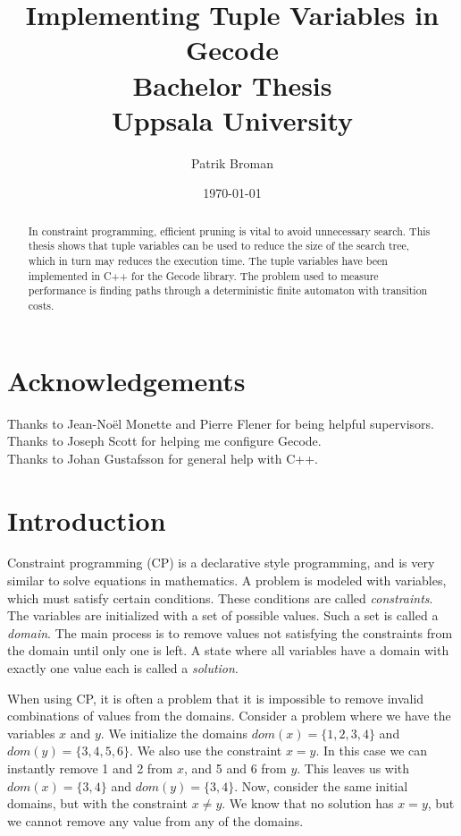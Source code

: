 \documentclass[a4paper,11pt]{article}
\title{\textbf{Implementing Tuple Variables in Gecode\\
	Bachelor Thesis \\
    Uppsala University  \\
  }
}
\author{Patrik Broman}
\date{\today}
\begin{document}
\maketitle
{}

\begin{abstract}

In constraint programming, efficient pruning is vital to avoid unnecessary search. This thesis shows that tuple variables can be used to reduce the size of the search tree, which in turn may reduces the execution time. The tuple variables have been implemented in C++ for the Gecode library. The problem used to measure performance is finding paths through a deterministic finite automaton with transition costs.

\end{abstract}

\setcounter{tocdepth}{2}
\tableofcontents
\pagestyle{plain}

\section*{Acknowledgements}
Thanks to Jean-No\"{e}l Monette and Pierre Flener for being helpful supervisors. \\
Thanks to Joseph Scott for helping me configure Gecode. \\
Thanks to Johan Gustafsson for general help with C++. \\

\section{Introduction}
Constraint programming (CP) is a declarative style programming, and is very similar to solve equations in mathematics. A problem is modeled with variables, which must satisfy certain conditions. These conditions are called \textit{constraints}. The variables are initialized with a set of possible values. Such a set is called a \textit{domain}. The main process is to remove values not satisfying the constraints from the domain until only one is left. A state where all variables have a domain with exactly one value each is called a \textit{solution}.

When using CP, it is often a problem that it is impossible to remove invalid combinations of values from the domains. Consider a problem where we have the variables $x$ and $y$. We initialize the domains $dom(x)=\{1,2,3,4\}$ and $dom(y)=\{3,4,5,6\}$. We also use the constraint $x=y$. In this case we can instantly remove 1 and 2 from $x$, and 5 and 6 from $y$. This leaves us with $dom(x)=\{3,4\}$ and $dom(y)=\{3,4\}$. Now, consider the same initial domains, but with the constraint $x\neq y$. We know that no solution has $x=y$, but we cannot remove any value from any of the domains. 
\end{document}
